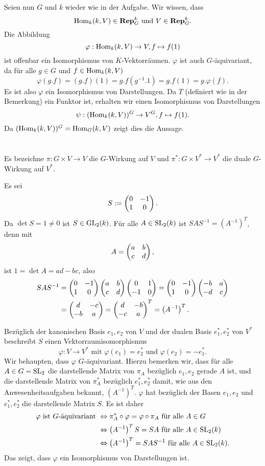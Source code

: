 \documentclass[a4paper,10pt]{article}
\begin{document}
Seien nun $G$ und $k$ wieder wie in der Aufgabe. Wir wissen, dass
\[
 \operatorname{Hom}_k(k,V) \in \mathbf{Rep}_G^k \text{ und } V \in \mathbf{Rep}_G^k.
\]
Die Abbildung 
\[
 \varphi: \operatorname{Hom}_k(k,V) \to V, f \mapsto f(1)
\]
ist offenbar ein Isomorphismus von $K$-Vektorräumen. $\varphi$ ist auch $G$-äquivariant, da für alle $g \in G$ und $f \in \operatorname{Hom}_k(k,V)$
\[
 \varphi(g.f) = (g.f)(1) = g.f(g^{-1}.1) = g.f(1) = g.\varphi(f).
\]
Es ist also $\varphi$ ein Isomorphismus von Darstellungen. Da $T$ (definiert wie in der Bemerkung) ein Funktor ist, erhalten wir einen Isomorphismus von Darstellungen
\[
 \psi : (\operatorname{Hom}_k(k,V))^G \to V^G, f \mapsto f(1).
\]
Da $(\operatorname{Hom}_k(k,V))^G = \operatorname{Hom}_G(k,V)$ zeigt dies die Aussage.





\section{}
Es bezeichne $\pi : G \times V \to V$ die $G$-Wirkung auf $V$ und $\pi^* : G \times V^* \to V^*$ die duale $G$-Wirkung auf $V^*$.

Es sei
\[
 S := \begin{pmatrix}0 & -1 \\ 1 & 0\end{pmatrix}.
\]
Da $\det S = 1 \neq 0$ ist $S \in \operatorname{GL}_2(k)$. Für alle $A \in \operatorname{SL}_2(k)$ ist $SAS^{-1} = (A^{-1})^T$, denn mit
\[
 A = \begin{pmatrix}a & b \\ c & d\end{pmatrix},
\]
ist $1 = \det A = ad-bc$, also
\begin{align*}
 SAS^{-1}
 &= \begin{pmatrix}0 & -1 \\ 1 & 0\end{pmatrix} \begin{pmatrix}a & b \\ c & d\end{pmatrix} \begin{pmatrix}0 & 1 \\ -1 & 0\end{pmatrix}
 = \begin{pmatrix}0 & -1 \\ 1 & 0\end{pmatrix} \begin{pmatrix}-b & a \\ -d & c\end{pmatrix} \\
 &= \begin{pmatrix}d & -c \\ -b & a\end{pmatrix}
 = \begin{pmatrix}d & -b \\ -c & a\end{pmatrix}^T
 = \left(A^{-1}\right)^T.
\end{align*}

Bezüglich der kanonischen Basis $e_1, e_2$ von $V$ und der dualen Basis $e_1^*, e_2^*$ von $V^*$ beschreibt $S$ einen Vektorraumisomorphismus
\[
 \varphi : V \to V^* \text{ mit } \varphi(e_1) =  e_2^* \text{ und } \varphi(e_2) = -e_1^*.
\]
Wir behaupten, dass $\varphi$ $G$-äquivariant. Hierzu bemerken wir, dass für alle $A \in G = \operatorname{SL}_2$ die darstellende Matrix von $\pi_A$ bezüglich $e_1, e_2$ gerade $A$ ist, und die darstellende Matrix von $\pi^*_A$ bezüglich $e_1^*, e_2^*$ damit, wie aus den Anwesenheitsaufgaben bekannt, $(A^{-1})^T$. $\varphi$ hat bezüglich der Basen $e_1, e_2$ und $e_1^*, e_2^*$ die darstellende Matrix $S$. Es ist daher
\begin{align*}
 \varphi \text{ ist $G$-äquivariant }
 &\Leftrightarrow \pi^*_A \circ \varphi = \varphi \circ \pi_A \text{ für alle } A \in G \\
 &\Leftrightarrow \left(A^{-1}\right)^T S = S A \text{ für alle } A \in \operatorname{SL}_2(k) \\
 &\Leftrightarrow \left(A^{-1}\right)^T = S A S^{-1} \text{ für alle } A \in \operatorname{SL}_2(k).
\end{align*}
Das zeigt, dass $\varphi$ ein Isomorphismus von Darstellungen ist.
\end{document}
